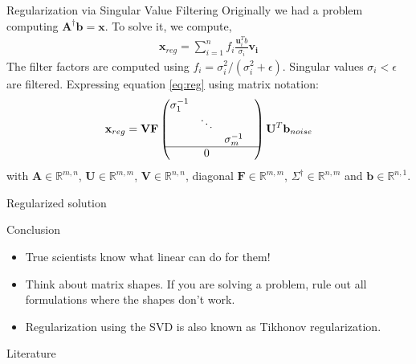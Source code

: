 \documentclass[notes=only]{beamer}
\begin{document}
  \begin{frame}{Regularization via Singular Value Filtering}
  Originally we had a problem computing $\mathbf{A}^{\dagger}\mathbf{b} = \mathbf{x}$.
  To solve it, we compute,
  \begin{align} \label{eq:reg}
      \mathbf{x}_{reg} = \sum_{i=1}^{n} f_i \frac{\mathbf{u}_i^T b}{\sigma_i}\mathbf{v_i}
  \end{align}
  The filter factors are computed using $f_i = \sigma_i^2 / (\sigma_i^2 + \epsilon)$.
  Singular values $\sigma_i < \epsilon$ are filtered.
  Expressing equation \ref{eq:reg} using matrix notation:
  \begin{align}
    \mathbf{x}_{reg}= \mathbf{V} \mathbf{F} \begin{pmatrix}
      \sigma_1^{-1} & & & \\
      &  \ddots & \\
      &  & \sigma_m^{-1} \\ \hline
      & 0 &
    \end{pmatrix}
    \mathbf{U}^T \mathbf{b}_{noise}
  \end{align}
  with $\mathbf{A} \in \mathbb{R}^{m,n}$, $\mathbf{U} \in \mathbb{R}^{m,m}$, $\mathbf{V} \in \mathbb{R}^{n,n}$, diagonal $\mathbf{F} \in \mathbb{R}^{m,m}$, $\Sigma^{\dagger} \in \mathbb{R}^{n,m}$
  and $\mathbf{b} \in \mathbb{R}^{n,1}$.
  \end{frame}

  \begin{frame}{Regularized solution}
    \begin{figure}
      
    \end{figure}
  \end{frame}

  \begin{frame}{Conclusion}
    \begin{itemize}
      \item True scientists know what linear can do for them!
      \item Think about matrix shapes. If you are solving a problem, rule out all formulations where the shapes don't work.
      \item Regularization using the SVD is also known as Tikhonov regularization.
    \end{itemize}
  \end{frame}

  \begin{frame}{Literature}
    \printbibliography
  \end{frame}
\end{document}
